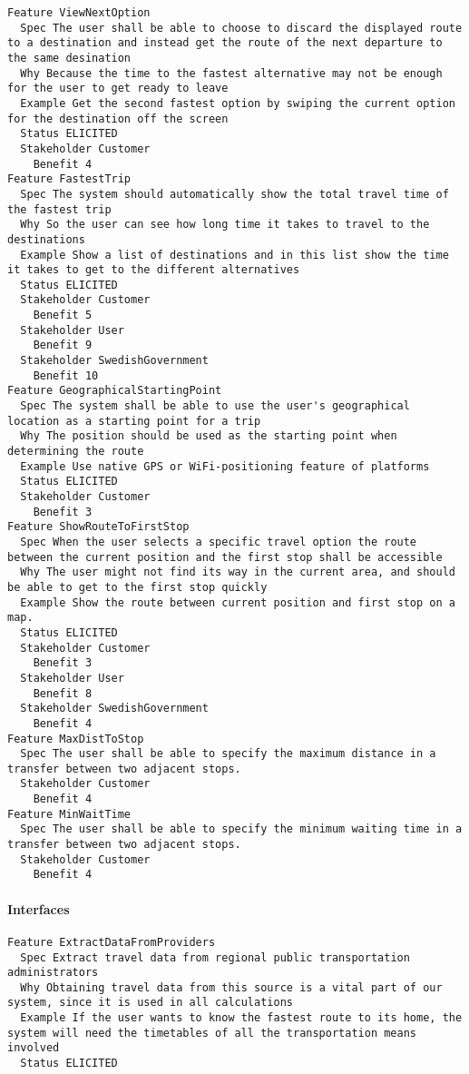 \begin{lstlisting}
Feature ViewNextOption
  Spec The user shall be able to choose to discard the displayed route to a destination and instead get the route of the next departure to the same desination
  Why Because the time to the fastest alternative may not be enough for the user to get ready to leave
  Example Get the second fastest option by swiping the current option for the destination off the screen
  Status ELICITED
  Stakeholder Customer
    Benefit 4
Feature FastestTrip
  Spec The system should automatically show the total travel time of the fastest trip
  Why So the user can see how long time it takes to travel to the destinations
  Example Show a list of destinations and in this list show the time it takes to get to the different alternatives
  Status ELICITED
  Stakeholder Customer
    Benefit 5
  Stakeholder User
    Benefit 9
  Stakeholder SwedishGovernment
    Benefit 10
Feature GeographicalStartingPoint
  Spec The system shall be able to use the user's geographical location as a starting point for a trip
  Why The position should be used as the starting point when determining the route
  Example Use native GPS or WiFi-positioning feature of platforms
  Status ELICITED
  Stakeholder Customer
    Benefit 3
Feature ShowRouteToFirstStop
  Spec When the user selects a specific travel option the route between the current position and the first stop shall be accessible
  Why The user might not find its way in the current area, and should be able to get to the first stop quickly
  Example Show the route between current position and first stop on a map.
  Status ELICITED
  Stakeholder Customer
    Benefit 3
  Stakeholder User
    Benefit 8
  Stakeholder SwedishGovernment
    Benefit 4
Feature MaxDistToStop
  Spec The user shall be able to specify the maximum distance in a transfer between two adjacent stops.
  Stakeholder Customer
    Benefit 4
Feature MinWaitTime
  Spec The user shall be able to specify the minimum waiting time in a transfer between two adjacent stops.
  Stakeholder Customer
    Benefit 4

\end{lstlisting}
    
        
       \paragraph{Interfaces}


\begin{lstlisting}
Feature ExtractDataFromProviders
  Spec Extract travel data from regional public transportation administrators
  Why Obtaining travel data from this source is a vital part of our system, since it is used in all calculations
  Example If the user wants to know the fastest route to its home, the system will need the timetables of all the transportation means involved
  Status ELICITED

\end{lstlisting}
    
